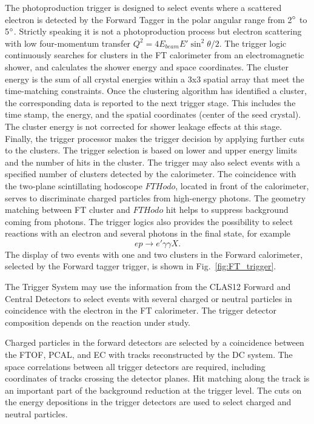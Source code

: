 The photoproduction trigger is designed to select events where a scattered electron is detected by the Forward Tagger in the polar angular range from 2$\degree$ to 5$\degree$. Strictly speaking it is not a photoproduction process but electron scattering with low four-momentum transfer $Q^2=4E_{beam}E'\sin^2\theta/2$. The trigger logic continuously searches for clusters in the FT calorimeter from an electromagnetic shower, and calculates the shower energy and space coordinates. The cluster energy is the sum of all  crystal energies within a 3x3 spatial array that meet the time-matching constraints. Once the clustering algorithm  has identified a cluster, the corresponding data is reported to the next trigger stage. This includes the time stamp, the energy, and the spatial coordinates (center of the seed crystal). The cluster energy is not corrected for shower leakage effects at this stage. Finally, the trigger processor makes the trigger decision by applying further cuts to the clusters. The trigger  selection is based on lower and upper energy limits and the number of hits in the cluster. The trigger may also select events with a specified number of clusters detected by the calorimeter.  The coincidence with the two-plane  scintillating hodoscope $FTHodo$,  located in front of the calorimeter, serves to discriminate charged particles from high-energy photons. The geometry matching between FT cluster and $FTHodo$ hit helps to suppress background coming from photons.  The trigger logics also provides  the possibility to select reactions with an electron and several photons in the final state, for example
$$
ep\to e'\gamma\gamma X.
$$
\noindent
The display of two events with  one and two clusters in the Forward calorimeter, selected by the Forward tagger trigger, is shown in Fig.~\ref{fig:FT_trigger}.

The Trigger System may use the  information from the CLAS12 Forward and Central Detectors to select events with several charged or neutral particles in coincidence with the electron in the FT calorimeter. The trigger detector composition depends on the reaction under study. 

Charged particles in the forward detectors are selected by a coincidence between the FTOF, PCAL, and EC with tracks reconstructed by the DC system. The space correlations between all trigger detectors are required, including coordinates of tracks crossing the detector planes. Hit matching along the track is an important part of the background reduction at the trigger level. The cuts on the energy depositions in the trigger detectors are used to select charged and neutral particles. 


